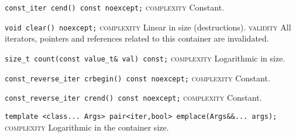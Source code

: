 \noindent{}\hspace*{0.25em}\lstinline[basicstyle=\ttfamily\color{cgreen}]{const_iter cend() const noexcept;} \textsc{complexity} Constant.\\\vspace{-0.6em}

\noindent{}\hspace*{0.25em}\lstinline[basicstyle=\ttfamily\color{corange}]{void clear() noexcept;} \textsc{complexity} Linear in size (destructions). \textsc{validity} All iterators, pointers and references related to this container are invalidated.\\\vspace{-0.6em}

\noindent{}\hspace*{0.25em}\lstinline[basicstyle=\ttfamily\color{clime}]{size_t count(const value_t& val) const;} \textsc{complexity} Logarithmic in size.\\\vspace{-0.6em}

\noindent{}\hspace*{0.25em}\lstinline[basicstyle=\ttfamily\color{cgreen}]{const_reverse_iter crbegin() const noexcept;} \textsc{complexity} Constant.\\\vspace{-0.6em}

\noindent{}\hspace*{0.25em}\lstinline[basicstyle=\ttfamily\color{cgreen}]{const_reverse_iter crend() const noexcept;} \textsc{complexity} Constant.\\\vspace{-0.6em}

\noindent{}\hspace*{0.25em}\lstinline[basicstyle=\ttfamily\color{clime}]{template <class... Args> pair<iter,bool> emplace(Args&&... args);} \textsc{complexity} Logarithmic in the container size.\\\vspace{-0.6em}

